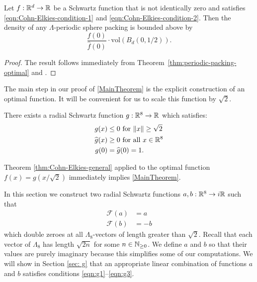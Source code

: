 \begin{theorem}\label{thm:Cohn-Elkies-general}\leanok
  Let $f:\mathbb{R}^d\to\mathbb{R}$ be a Schwartz function that is not identically zero and satisfies \eqref{eqn:Cohn-Elkies-condition-1} and \eqref{eqn:Cohn-Elkies-condition-2}. Then the density of any $\Lambda$-periodic sphere packing is bounded above by $$\frac{f(0)}{\widehat{f}(0)}\cdot \mathrm{vol}(B_d(0,1/2)).$$
\end{theorem}
\begin{proof}\leanok
  The result follows immediately from Theorem~\ref{thm:periodic-packing-optimal} and .
\end{proof}

The main step in our proof of \cref{MainTheorem} is the explicit construction of an optimal function. It will be convenient for us to scale this function by $\sqrt{2}$.
\begin{theorem}\label{thm:g}
There exists a radial Schwartz function $g:\mathbb{R}^8\to\mathbb{R}$ which satisfies:
\begin{align}
g(x)&\leq 0\mbox{ for } \|x\|\geq \sqrt{2} \label{eqn:g1}\\
\widehat{g}(x)&\geq0\mbox{ for all } x\in\mathbb{R}^8\label{eqn:g2}\\
g(0)&=\widehat{g}(0)=1.\label{eqn:g3}
\end{align}
\end{theorem}
Theorem \ref{thm:Cohn-Elkies-general} applied to the optimal function $f(x)=g(x/\sqrt{2})$ immediately implies \cref{MainTheorem}.



In this section we construct two radial Schwartz functions $a,b:\mathbb{R}^8\to i\mathbb{R}$ such that
\begin{align}\mathcal{F}(a)&=a\label{eqn:a-fourier}\\
    \mathcal{F}(b)&=-b\label{eqn:b-fourier}
\end{align}
which double zeroes at all $\Lambda_8$-vectors of length greater than $\sqrt{2}$. Recall that each vector of $\Lambda_8$ has length $\sqrt{2n}$ for some $n\in\mathbb{N}_{\geq 0}$.
We define $a$ and $b$ so that their values are purely imaginary because this simplifies some of our computations.
We will show in Section \ref{sec: g} that an appropriate linear combination of functions $a$ and $b$ satisfies conditions \eqref{eqn:g1}--\eqref{eqn:g3}.

